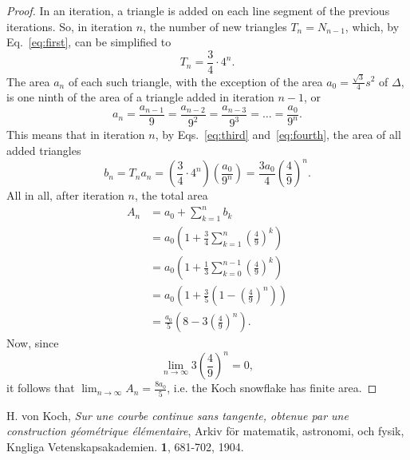 \documentclass[12pt, a4paper]{article}
\newcommand{\ubersum}[2] {
	\sum_{k=#2}^{n#1}
}
\begin{document}
\begin{proof}
In an iteration, a triangle is added on each line segment of the
previous iterations. So, in iteration $n$, the number of new triangles
$T_n = N_{n-1}$, which, by Eq.~\ref{eq:first}, can be simplified to
\begin{equation}\label{eq:third}
	T_n = \frac 3 4 \cdot 4^n.
\end{equation}
The area $a_n$ of each such triangle, with the exception of the area
$a_0 = \frac {\sqrt 3} 4 s^2$ of $\Delta$, is one ninth of the area of a
triangle added in iteration $n - 1$, or
%
\begin{equation}\label{eq:fourth}
	a_n = \frac {a_{n-1}} {9}
		= \frac {a_{n-2}} {9^2}
		= \frac {a_{n-3}} {9^3}
		= \ldots
		= \frac {a_0} {9^n}.
\end{equation}
This means that in iteration $n$, by Eqs.~\ref{eq:third} and~\ref{eq:fourth}, the area of all added
triangles
$$b_n = T_na_n = \left (
		\frac 3 4 \cdot 4^n
	\right )
	\left (
		\frac {a_0} {9^n}
	\right ) = \frac {3a_0} 4 \left (
	\frac 4 9
	\right )^n.$$
All in all, after iteration $n$, the total area
\begin{align*}
	A_n &= a_0 + \ubersum{}{1} b_k \\
		&= a_0 \left (
				1 + \frac 3 4 \ubersum{}{1}\left(\frac 4 9 \right )^k
			\right ) \\
		&= a_0 \left (
				1 + \frac 1 3 \ubersum{-1}{0}\left(\frac 4 9 \right )^k
			\right ) \\
		&= a_0 \left (
				1 + \frac 3 5 \left ( 1 - \left( \frac 4 9 \right )^n \right )
			\right ) \\
		&= \frac {a_0} 5 \left (
				8 - 3 \left ( \frac 4 9 \right )^n
			\right ).
\end{align*}
Now, since
$$
	\lim_{n \to \infty} 3 \left ( \frac 4 9 \right )^n = 0,
$$
it follows that $\lim_{n \to \infty} A_n = \frac {8a_0} 5$, i.e. the Koch
snowflake has finite area.
\end{proof}
\begin{thebibliography}{99}
		H. von Koch,
		\emph{Sur une courbe continue sans tangente, obtenue par une
		construction géométrique élémentaire},
		Arkiv för matematik, astronomi, och fysik, Kngliga Vetenskapsakademien.
		{\bf 1},
		681-702,
		1904.
\end{thebibliography}

%
\end{document}
